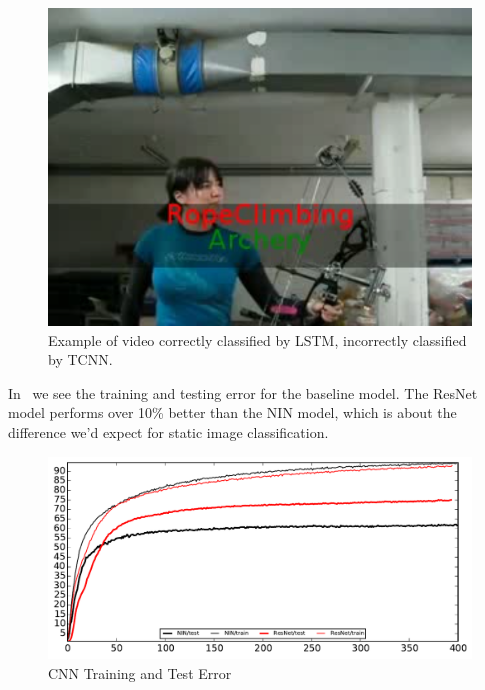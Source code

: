 \begin{figure}
  \centering
  \includegraphics[width=0.8\linewidth]{figs/demo}
  \caption{Example of video correctly classified by LSTM, incorrectly classified by TCNN. }
  \label{fig:demo}
\end{figure}


In~ we see the training and testing error for the baseline model. The ResNet model performs over 10\% better than the NIN model, which is about the difference we'd expect for static image classification. 
\begin{figure}
  \centering
  \includegraphics[width=1.0\linewidth]{figs/CNNout}
  \caption{CNN Training and Test Error}
  \label{fig:cnntest}
\end{figure}


